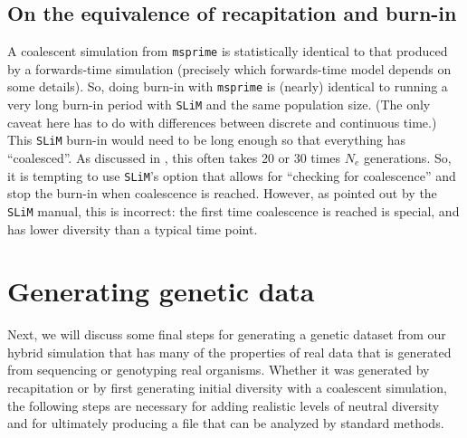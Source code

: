 \documentclass[12pt]{article}
\newcommand{\msprime}[0]{\texttt{msprime}\xspace}
\newcommand{\slim}[0]{\texttt{SLiM}\xspace}
\begin{document}
\subsection{On the equivalence of recapitation and burn-in}

A coalescent simulation from \msprime
is statistically identical to that produced by a forwards-time simulation
(precisely which forwards-time model depends on some details).
So, doing burn-in with \msprime is (nearly) identical to running a very long burn-in period
with \slim and the same population size.
(The only caveat here has to do with differences between discrete and continuous time.)
This \slim burn-in would need to be long enough so that everything has ``coalesced''.
As discussed in \citet{haller_tree-sequence_2019}, this often takes 20 or 30 times $N_e$ generations.
So, it is tempting to use \slim's option that allows for ``checking for coalescence''
and stop the burn-in when coalescence is reached.
However, as pointed out by the \slim manual,
this is incorrect: the first time coalescence is reached is special, and has lower diversity than a typical time point.


\section{Generating genetic data}

Next, we will discuss some final steps for generating a genetic dataset from our hybrid simulation that has many of the properties of real data that is generated from
sequencing or genotyping real organisms. Whether it was generated by recapitation or by first generating initial
diversity with a coalescent simulation, the following steps are necessary for adding realistic levels of neutral diversity and for ultimately producing a
file that can be analyzed by standard methods.
\end{document}
